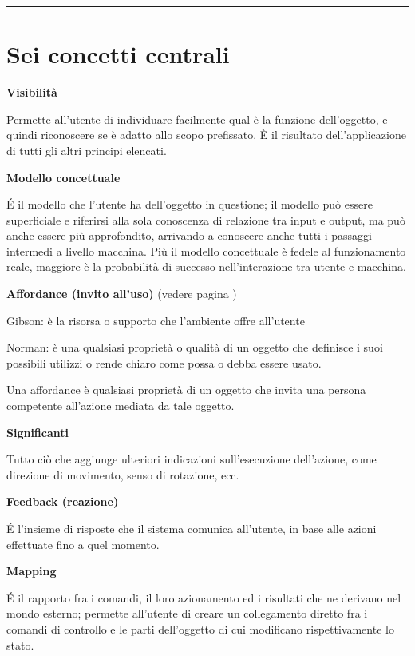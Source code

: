 \documentclass[11pt,a4paper]{book}
\begin{document}
\noindent\rule{\textwidth}{1pt}

\section{Sei concetti centrali}
\begin{center}
	\textbf{Visibilità}
\end{center}
Permette all’utente di individuare facilmente qual è la funzione dell’oggetto, e quindi riconoscere se è adatto allo scopo prefissato. È il risultato dell’applicazione di tutti gli altri principi elencati.

\begin{center}
	\textbf{Modello concettuale}
\end{center}
É il modello che l’utente ha dell’oggetto in questione; il modello può essere superficiale e riferirsi alla sola conoscenza di relazione tra input e output, ma può anche essere più approfondito, arrivando a conoscere anche tutti i passaggi intermedi a livello macchina. Più il modello concettuale è fedele al funzionamento reale, maggiore è la probabilità di successo nell’interazione tra utente e macchina.

\begin{center}
	\textbf{Affordance (invito all’uso)} (vedere pagina \pageref{par: affordance})
\end{center}
Gibson: è la risorsa o supporto che l'ambiente offre all'utente

Norman: è una qualsiasi proprietà o qualità di un oggetto che definisce i suoi possibili utilizzi o rende chiaro come possa o debba essere usato.

Una affordance è qualsiasi proprietà di un oggetto che invita una persona competente all'azione mediata da tale oggetto.

\begin{center}
	\textbf{Significanti}
\end{center}
Tutto ciò che aggiunge ulteriori indicazioni sull’esecuzione dell’azione, come direzione di movimento, senso di rotazione, ecc.

\begin{center}
	\textbf{Feedback (reazione)}
\end{center}
É l’insieme di risposte che il sistema comunica all’utente, in base alle azioni effettuate fino a quel momento.

\begin{center}
	\textbf{Mapping}
\end{center}	
É il rapporto fra i comandi, il loro azionamento ed i risultati che ne derivano nel mondo esterno; permette all’utente di creare un collegamento diretto fra i comandi di controllo e le parti dell’oggetto di cui modificano rispettivamente lo stato.
\end{document}
